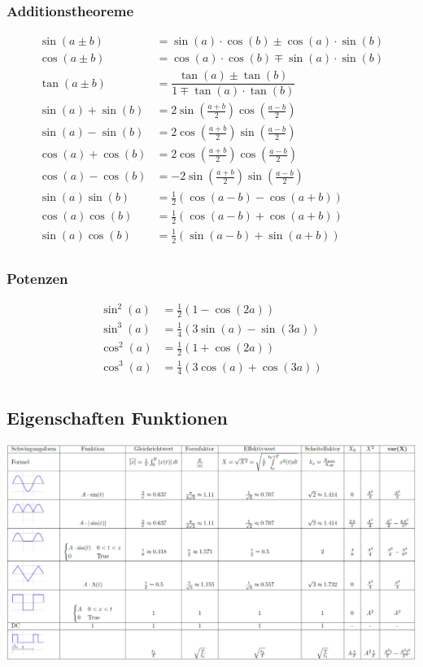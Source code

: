 \subsubsection{Additionstheoreme}
\begin{align*}
	\sin(a \pm b)&=\sin(a) \cdot \cos(b) \pm \cos(a) \cdot \sin(b)\\
	\cos(a \pm b)&=\cos(a) \cdot \cos(b) \mp \sin(a) \cdot \sin(b)\\	
	\tan(a \pm b)&=\dfrac{\tan(a) \pm \tan(b)}{1 \mp \tan(a) \cdot \tan(b)}\\
	\sin(a)+\sin(b) &= 2\sin\left(\frac{a + b}{2}\right)\cos\left(\frac{a - b}{2}\right)\\
	\sin(a)-\sin(b) &= 2\cos\left(\frac{a + b}{2}\right)\sin\left(\frac{a - b}{2}\right)\\
	\cos(a)+\cos(b) &= 2\cos\left(\frac{a + b}{2}\right)\cos\left(\frac{a - b}{2}\right)\\
	\cos(a)-\cos(b) &= -2\sin\left(\frac{a + b}{2}\right)\sin\left(\frac{a - b}{2}\right)\\
	\sin(a)\sin(b)&=\frac{1}{2}(\cos(a-b)-\cos(a+b))\\
	\cos(a)\cos(b)&=\frac{1}{2}(\cos(a-b)+\cos(a+b))\\
	\sin(a)\cos(b)&=\frac{1}{2}(\sin(a-b)+\sin(a+b))\\
\end{align*}

\subsubsection{Potenzen}
\begin{align*}
	\sin^2(a) &= \frac{1}{2}(1 - \cos(2a)) \\
	\sin^3(a) &= \frac{1}{4}(3\sin(a) - \sin(3a)) \\
	\cos^2(a) &= \frac{1}{2}(1 + \cos(2a)) \\
	\cos^3(a) &= \frac{1}{4}(3\cos(a) + \cos(3a)) \\
\end{align*}

\begin{landscape}
	\section{Eigenschaften Funktionen}
	\begin{center}
		\includegraphics[width=\linewidth]{./Images/eigenschaften.png}
	\end{center}
\end{landscape}

